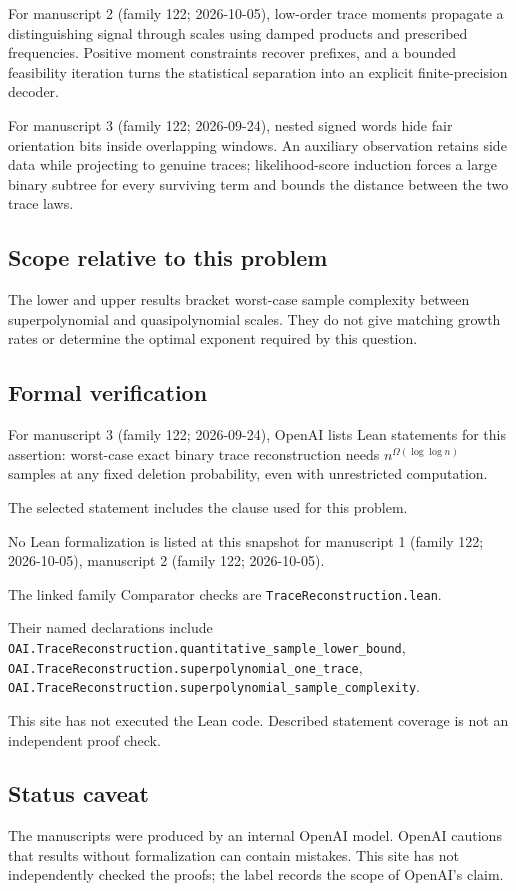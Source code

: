 \documentclass[11pt]{article}
\begin{document}
For manuscript 2 (family 122; 2026-10-05), low-order trace moments propagate a distinguishing signal through scales using damped products and prescribed frequencies. Positive moment constraints recover prefixes, and a bounded feasibility iteration turns the statistical separation into an explicit finite-precision decoder.

For manuscript 3 (family 122; 2026-09-24), nested signed words hide fair orientation bits inside overlapping windows. An auxiliary observation retains side data while projecting to genuine traces; likelihood-score induction forces a large binary subtree for every surviving term and bounds the distance between the two trace laws.

\subsection{Scope relative to this problem}
The lower and upper results bracket worst-case sample complexity between superpolynomial and quasipolynomial scales. They do not give matching growth rates or determine the optimal exponent required by this question.

\subsection{Formal verification}
For manuscript 3 (family 122; 2026-09-24), OpenAI lists Lean statements for this assertion: worst-case exact binary trace reconstruction needs $n^{\Omega(\log\log n)}$ samples at any fixed deletion probability, even with unrestricted computation.

The selected statement includes the clause used for this problem.

No Lean formalization is listed at this snapshot for manuscript 1 (family 122; 2026-10-05), manuscript 2 (family 122; 2026-10-05).

The linked family Comparator checks are \texttt{TraceReconstruction.lean}.

Their named declarations include \texttt{OAI.TraceReconstruction.quantitative\_sample\_lower\_bound}, \texttt{OAI.TraceReconstruction.superpolynomial\_one\_trace}, \texttt{OAI.TraceReconstruction.superpolynomial\_sample\_complexity}.

This site has not executed the Lean code. Described statement coverage is not an independent proof check.

\subsection{Status caveat}
The manuscripts were produced by an internal OpenAI model. OpenAI cautions that results without formalization can contain mistakes. This site has not independently checked the proofs; the label records the scope of OpenAI's claim.
\end{document}
